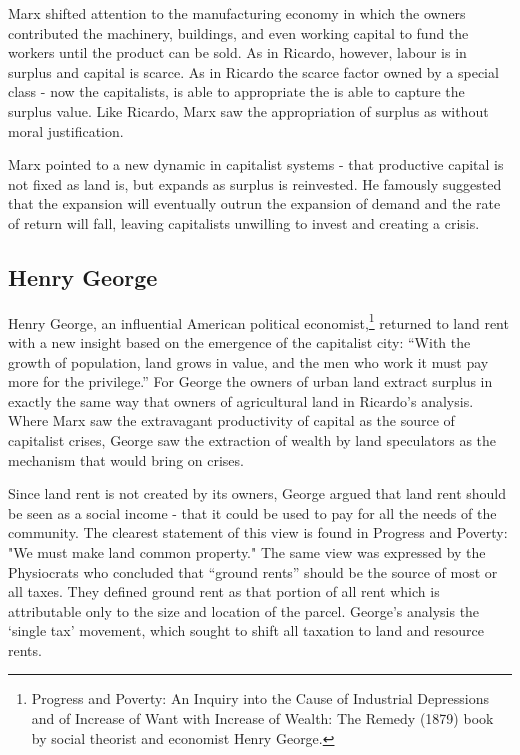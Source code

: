  Marx shifted attention to the manufacturing economy in which the owners contributed the machinery, buildings, and even working capital to fund the workers until the product can be sold. %
As in Ricardo, however, labour is in surplus and capital is scarce. As in Ricardo the scarce factor owned by a special class - now the capitalists, is able to appropriate the is able to capture the surplus value. Like Ricardo,  Marx saw the appropriation of surplus as without moral justification. 

Marx pointed to a new dynamic in capitalist systems - that productive capital is not fixed as land is, but  expands as surplus is reinvested. He famously suggested that the expansion will eventually outrun the expansion of demand and the rate of return will fall, leaving capitalists unwilling to invest and creating a crisis. 


 
\subsection{Henry George} 
  Henry George, an influential American political economist,\footnote{Progress and Poverty: An Inquiry into the Cause of Industrial Depressions and of Increase of Want with Increase of Wealth: The Remedy (1879) book by social theorist and economist Henry George.}  returned to land rent with a new insight based on the emergence of the capitalist city: ``With the growth of population, land grows in value, and the men who work it must pay more for the privilege.'' For George the owners of urban land extract surplus in exactly the same way that owners of agricultural land in Ricardo's analysis. Where Marx saw  the extravagant productivity of capital  as the source of capitalist crises, George saw the extraction of wealth by land speculators as the mechanism that would bring on crises.
  
  Since land rent is not created by its owners, George argued that land rent should be seen as a social income - that it could be used to pay for all the needs of the community. The clearest statement of this view is found in Progress and Poverty: "We must make land common property." The same view was expressed by the Physiocrats who concluded  that ``ground rents'' should be the source of most or all taxes. They defined ground rent as that portion of all rent which is attributable only to the size and location of the parcel. George's analysis the `single tax' movement, which sought to shift all taxation to land  and resource rents.   
  
